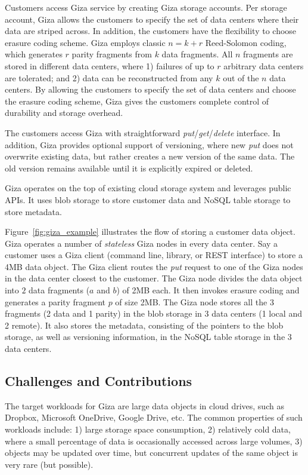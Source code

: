Customers access Giza service by creating Giza storage accounts. Per storage account, Giza allows the customers to specify the set of data centers where their data are striped across. In addition, the customers have the flexibility to choose erasure coding scheme. Giza employs classic $n = k + r$ Reed-Solomon coding, which generates $r$ parity fragments from $k$ data fragments. All $n$ fragments are stored in different data centers, where 1) failures of up to $r$ arbitrary data centers are tolerated; and 2) data can be reconstructed from any $k$ out of the $n$ data centers. By allowing the customers to specify the set of data centers and choose the erasure coding scheme, Giza gives the customers complete control of durability and storage overhead.

The customers access Giza with straightforward {\em put}/{\em get}/{\em delete} interface. In addition, Giza provides optional support of versioning, where new {\em put} does not overwrite existing data, but rather creates a new version of the same data. The old version remains available until it is explicitly expired or deleted.

Giza operates on the top of existing cloud storage system and leverages public APIs. It uses blob storage to store customer data and NoSQL table storage to store metadata.

Figure~\ref{fig:giza_example} illustrates the flow of storing a customer data object. Giza operates a number of {\em stateless} Giza nodes in every data center. Say a customer uses a Giza client (command line, library, or REST interface) to store a 4MB data object. The Giza client routes the {\em put} request to one of the Giza nodes in the data center closest to the customer. The Giza node divides the data object into $2$ data fragments ($a$ and $b$) of 2MB each. It then invokes erasure coding and generates a parity fragment $p$ of size 2MB. The Giza node stores all the $3$ fragments (2 data and 1 parity) in the blob storage in 3 data centers (1 local and 2 remote). It also stores the metadata, consisting of the pointers to the blob storage, as well as versioning information, in the NoSQL table storage in the 3 data centers.

\subsection{Challenges and Contributions}

The target workloads for Giza are large data objects in cloud drives, such as Dropbox, Microsoft OneDrive, Google Drive, etc. The common properties of such workloads include: 1) large storage space consumption, 2) relatively cold data, where a small percentage of data is occasionally accessed across large volumes, 3) objects may be updated over time, but concurrent updates of the same object is very rare (but possible).

